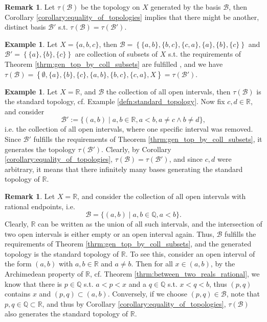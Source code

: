 \documentclass[12pt, a4paper]{article}
\numberwithin{equation}{section}
\theoremstyle{definition}
\theoremstyle{definition}
\newtheorem{exmp}[thm]{Example} %
\newtheorem{remark}[thm]{Remark} %
\begin{document}
		\begin{remark}
			Let $\tau(\mathscr B)$ be the topology on $X$ generated by the basis $\mathscr B$, then Corollary \ref{corollary:equality_of_topologies} implies that there might be another, distinct basis $\mathscr B'$ s.t. $\tau(\mathscr B) = \tau(\mathscr B')$.
		\end{remark}
	
		\begin{exmp}
			Let $X = \{ a, b, c \}$, then $\mathscr B = \left\{ \{a, b\}, \{b, c \}, \{c, a\}, \{a\}, \{b\}, \{c\}\right\}$ and $\mathscr B' = \left\{ \{a\}, \{b\}, \{c\} \right\}$ are collection of subsets of $X$ s.t. the requirements of Theorem \ref{thrm:gen_top_by_coll_subsets} are fulfilled \cite{1333309}, and we have $\tau(\mathscr B) = \left\{ \emptyset, \{a\}, \{b\}, \{c\}, \{a, b\}, \{b, c\}, \{c, a\}, X \right\} = \tau(\mathscr B')$.
		\end{exmp}
	
		\begin{exmp}
			Let $X=\mathbb R$, and $\mathscr B$ the collection of all open intervals, then $\tau(\mathscr B)$ is the standard topology, cf. Example \ref{defn:standard_topology}. Now fix $c, d\in\mathbb R$, and consider $$\mathscr B' := \{(a, b) \mid a,b\in\mathbb R, a < b, a\ne c \wedge b\ne d\},$$ i.e. the collection of all open intervals, where one specific interval was removed. Since $\mathscr B'$ fulfills the requirements of Theorem \ref{thrm:gen_top_by_coll_subsets}, it generates the topology $\tau(\mathscr B')$. Clearly, by Corollary \ref{corollary:equality_of_topologies}, $\tau(\mathscr B) = \tau(\mathscr B')$, and since $c, d$ were arbitrary, it means that there infinitely many bases generating the standard topology of $\mathbb R$.
		\end{exmp}
	
		\begin{remark}
			Let $X=\mathbb R$, and consider the collection of all open intervals with rational endpoints, i.e. 
			$$\mathscr B = \{(a, b)\mid a, b\in\mathbb Q, a < b\}.$$ Clearly, $\mathbb R$ can be written as the union of all such intervals, and the intersection of two open intervals is either empty or an open interval again. Thus, $\mathscr B$ fulfills the requirements of Theorem \ref{thrm:gen_top_by_coll_subsets}, and the generated topology is the standard topology of $\mathbb R$. To see this, consider an open interval of the form $(a, b)$ with $a, b\in\mathbb R$ and $a\ne b$. Then for all $x\in (a, b)$, by the Archimedean property of $\mathbb R$, cf. Theorem \ref{thrm:between_two_reals_rational}, we know that there is $p\in\mathbb Q$ s.t. $a < p < x$ and a $q\in\mathbb Q$ s.t. $x < q < b$, thus $(p, q)$ contains $x$ and $(p, q) \subset (a, b)$. Conversely, if we choose $(p, q)\in\mathscr B$, note that $p, q\in\mathbb Q\subset \mathbb R$, and thus by Corollary \ref{corollary:equality_of_topologies}, $\tau(\mathscr B)$ also generates the standard topology of $\mathbb R$.
		\end{remark}
	
\end{document}
